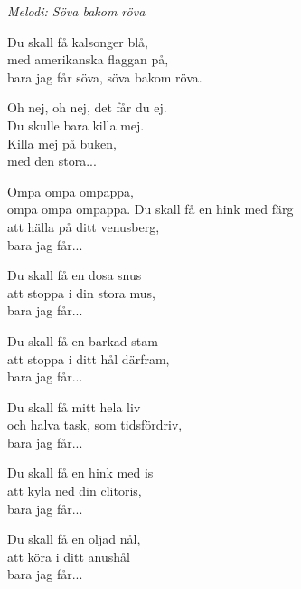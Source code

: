 {\footnotesize\textit{Melodi: Söva bakom röva}}\par
\vspace{10pt}
Du skall få kalsonger blå,\\
med amerikanska flaggan på,\\
bara jag får söva, söva bakom röva. \par
\vspace{10pt}
Oh nej, oh nej, det får du ej.\\
Du skulle bara killa mej.\\
Killa mej på buken,\\
med den stora...\par
\vspace{10pt}
Ompa ompa ompappa,\\
ompa ompa ompappa.
\newpage
Du skall få en hink med färg\\
att hälla på ditt venusberg,\\
bara jag får...\par
\vspace{10pt}
Du skall få en dosa snus\\
att stoppa i din stora mus,\\
bara jag får...\par
\vspace{10pt}
Du skall få en barkad stam\\
att stoppa i ditt hål därfram,\\
bara jag får...\par
\vspace{10pt}
Du skall få mitt hela liv\\
och halva task, som tidsfördriv,\\
bara jag får...\par
\vspace{10pt}
Du skall få en hink med is\\
att kyla ned din clitoris,\\
bara jag får...\par
\vspace{10pt}
Du skall få en oljad nål,\\
att köra i ditt anushål\\
bara jag får...
